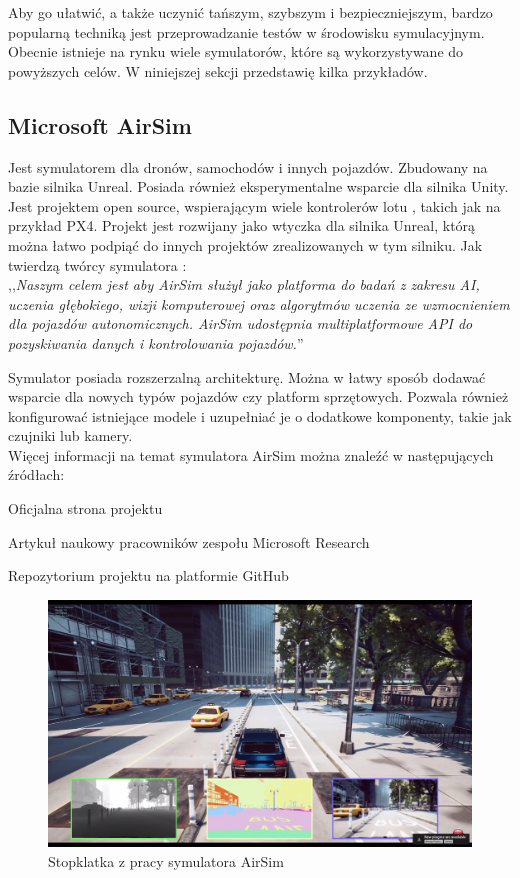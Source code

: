 Aby go ułatwić, a także uczynić tańszym, szybszym i bezpieczniejszym, bardzo popularną techniką jest przeprowadzanie testów w środowisku symulacyjnym. Obecnie istnieje na rynku wiele symulatorów, które są wykorzystywane do powyższych celów. W niniejszej sekcji przedstawię kilka przykładów.

\vspace{1cm}
\subsection{Microsoft AirSim}
Jest symulatorem dla dronów, samochodów i innych pojazdów. Zbudowany na bazie silnika Unreal. Posiada również eksperymentalne wsparcie dla silnika Unity. Jest projektem open source, wspierającym wiele kontrolerów lotu \cite{getfpv:flightControllers}, takich jak na przykład PX4. Projekt jest rozwijany jako wtyczka dla silnika Unreal, którą można łatwo podpiąć do innych projektów zrealizowanych w tym silniku. Jak twierdzą twórcy symulatora \cite{airsim:introducing}: \\
,,\textit{Naszym celem jest aby AirSim służył jako platforma do badań z zakresu AI, uczenia głębokiego, wizji komputerowej oraz algorytmów uczenia ze wzmocnieniem dla pojazdów autonomicznych. AirSim udostępnia multiplatformowe API do pozyskiwania danych i kontrolowania pojazdów.}''

Symulator posiada rozszerzalną architekturę. Można w łatwy sposób dodawać wsparcie dla nowych typów pojazdów czy platform sprzętowych. Pozwala również konfigurować istniejące modele i uzupełniać je o dodatkowe komponenty, takie jak czujniki lub kamery. \\
Więcej informacji na temat symulatora AirSim można znaleźć w następujących źródłach:
\begin{itemize*}
\item Oficjalna strona projektu \cite{airsim:website}
\item Artykuł naukowy pracowników zespołu Microsoft Research \cite{MSR-TR-2017-9}
\item Repozytorium projektu na platformie GitHub \cite{airsim:github}
\end{itemize*}

\vspace{0.5cm}
\begin{figure}[H]
\centering
\includegraphics[width=16cm]{resources/figures/airsim_snapshot.png}
\caption{Stopklatka z pracy symulatora AirSim}
\label{AirSimSnapshot}
\end{figure}

